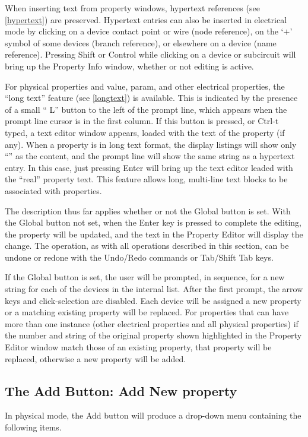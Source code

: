 When inserting text from property windows, hypertext references (see
\ref{hypertext}) are preserved.  Hypertext entries can also be
inserted in electrical mode by clicking on a device contact point or
wire (node reference), on the `$+$' symbol of some devices (branch
reference), or elsewhere on a device (name reference).  Pressing {\kb
Shift} or {\kb Control} while clicking on a device or subcircuit will
bring up the {\cb Property Info} window, whether or not editing is
active.

For physical properties and {\et value}, {\et param}, and {\et other}
electrical properties, the ``long text'' feature (see \ref{longtext})
is available.  This is indicated by the presence of a small ``{\cb
L}'' button to the left of the prompt line, which appears when the
prompt line cursor is in the first column.  If this button is pressed,
or {\kb Ctrl-t} typed, a text editor window appears, loaded with the
text of the property (if any).  When a property is in long text
format, the display listings will show only ``{\vt [text]}'' as the
content, and the prompt line will show the same string as a hypertext
entry.  In this case, just pressing {\kb Enter} will bring up the text
editor leaded with the ``real'' property text.  This feature allows
long, multi-line text blocks to be associated with properties.

The description thus far applies whether or not the {\cb Global}
button is set.  With the {\cb Global} button not set, when the {\kb
Enter} key is pressed to complete the editing, the property will be
updated, and the text in the {\cb Property Editor} will display the
change.  The operation, as with all operations described in this
section, can be undone or redone with the {\cb Undo}/{\cb Redo}
commands or {\kb Tab}/{\kb Shift Tab} keys.

If the {\cb Global} button is set, the user will be prompted, in
sequence, for a new string for each of the devices in the internal
list.  After the first prompt, the arrow keys and click-selection are
disabled.  Each device will be assigned a new property or a matching
existing property will be replaced.  For properties that can have more
than one instance ({\et other} electrical properties and all physical
properties) if the number and string of the original property shown
highlighted in the {\cb Property Editor} window match those of an
existing property, that property will be replaced, otherwise a new
property will be added.

\subsection{The {\cb Add} Button: Add New property}
In physical mode, the {\cb Add} button will produce a drop-down menu
containing the following items.


